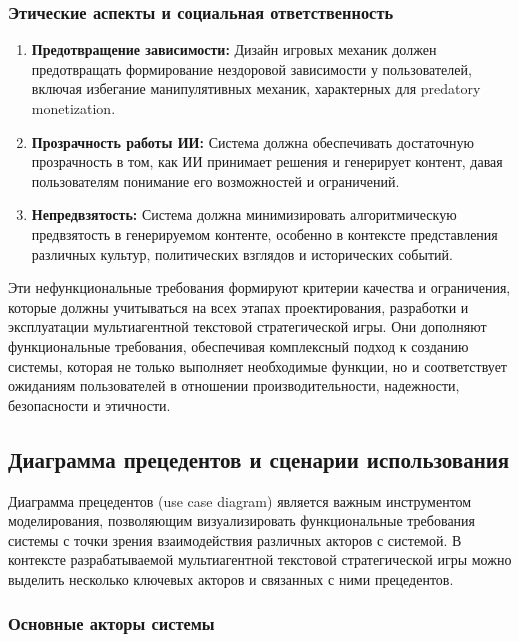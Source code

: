 \subsubsection{Этические аспекты и социальная ответственность}

\begin{enumerate}[label=NFR\arabic*., resume]
    \item \textbf{Предотвращение зависимости:} Дизайн игровых механик должен предотвращать формирование нездоровой зависимости у пользователей, включая избегание манипулятивных механик, характерных для predatory monetization.

    \item \textbf{Прозрачность работы ИИ:} Система должна обеспечивать достаточную прозрачность в том, как ИИ принимает решения и генерирует контент, давая пользователям понимание его возможностей и ограничений.

    \item \textbf{Непредвзятость:} Система должна минимизировать алгоритмическую предвзятость в генерируемом контенте, особенно в контексте представления различных культур, политических взглядов и исторических событий.

\end{enumerate}

Эти нефункциональные требования формируют критерии качества и ограничения, которые должны учитываться на всех этапах проектирования, разработки и эксплуатации мультиагентной текстовой стратегической игры. Они дополняют функциональные требования, обеспечивая комплексный подход к созданию системы, которая не только выполняет необходимые функции, но и соответствует ожиданиям пользователей в отношении производительности, надежности, безопасности и этичности.

\subsection{Диаграмма прецедентов и сценарии использования}

Диаграмма прецедентов (use case diagram) является важным инструментом моделирования, позволяющим визуализировать функциональные требования системы с точки зрения взаимодействия различных акторов с системой. В контексте разрабатываемой мультиагентной текстовой стратегической игры можно выделить несколько ключевых акторов и связанных с ними прецедентов.

\subsubsection{Основные акторы системы}


